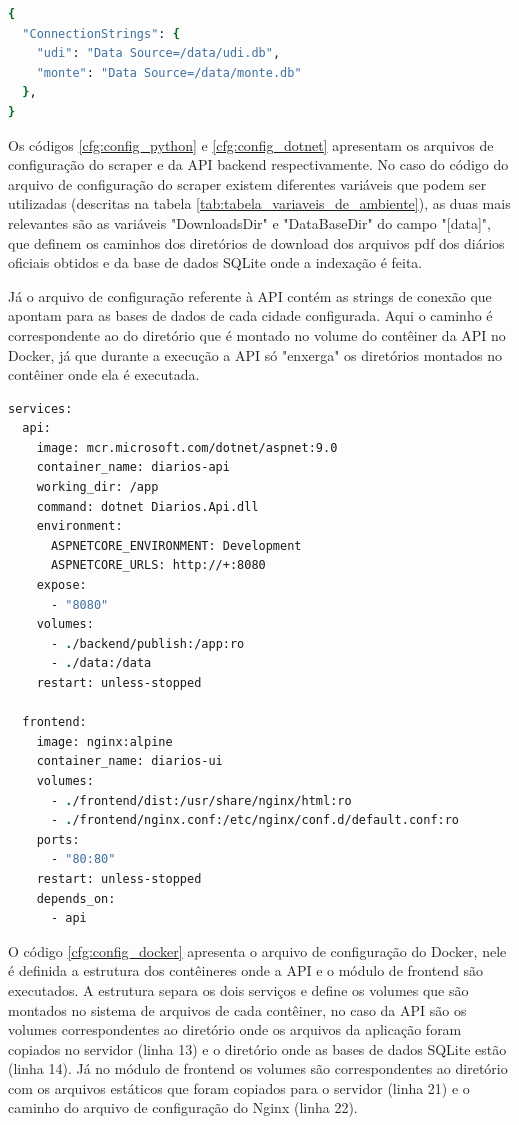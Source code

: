 \begin{lstlisting}[caption={appsettings.env.json}, label={cfg:config_dotnet}, language=csh]
{
  "ConnectionStrings": {
    "udi": "Data Source=/data/udi.db",
    "monte": "Data Source=/data/monte.db"
  },
}
\end{lstlisting}

Os códigos \ref{cfg:config_python} e \ref{cfg:config_dotnet} apresentam os arquivos de configuração do scraper e da API backend respectivamente. No caso do código do arquivo de configuração do scraper existem diferentes variáveis que podem ser utilizadas (descritas na tabela \ref{tab:tabela_variaveis_de_ambiente}), as duas mais relevantes são as variáveis "DownloadsDir" e "DataBaseDir" do campo "[data]", que definem os caminhos dos diretórios de download dos arquivos pdf dos diários oficiais obtidos e da base de dados SQLite onde a indexação é feita.

Já o arquivo de configuração referente à API contém as strings de conexão que apontam para as bases de dados de cada cidade configurada. Aqui o caminho é correspondente ao do diretório que é montado no volume do contêiner da API no Docker, já que durante a execução a API só "enxerga" os diretórios montados no contêiner onde ela é executada.

\begin{lstlisting}[caption={docker-compose.yml}, label={cfg:config_docker}, language=csh]
services:
  api:
    image: mcr.microsoft.com/dotnet/aspnet:9.0
    container_name: diarios-api
    working_dir: /app
    command: dotnet Diarios.Api.dll
    environment:
      ASPNETCORE_ENVIRONMENT: Development
      ASPNETCORE_URLS: http://+:8080
    expose:
      - "8080"
    volumes:
      - ./backend/publish:/app:ro
      - ./data:/data
    restart: unless-stopped

  frontend:
    image: nginx:alpine
    container_name: diarios-ui
    volumes:
      - ./frontend/dist:/usr/share/nginx/html:ro
      - ./frontend/nginx.conf:/etc/nginx/conf.d/default.conf:ro
    ports:
      - "80:80"
    restart: unless-stopped
    depends_on:
      - api
\end{lstlisting}

O código \ref{cfg:config_docker} apresenta o arquivo de configuração do Docker, nele é definida a estrutura dos contêineres onde a API e o módulo de frontend são executados. A estrutura separa os dois serviços e define os volumes que são montados no sistema de arquivos de cada contêiner, no caso da API são os volumes correspondentes ao diretório onde os arquivos da aplicação foram copiados no servidor (linha 13) e o diretório onde as bases de dados SQLite estão (linha 14). Já no módulo de frontend os volumes são correspondentes ao diretório com os arquivos estáticos que foram copiados para o servidor (linha 21) e o caminho do arquivo de configuração do Nginx (linha 22).


